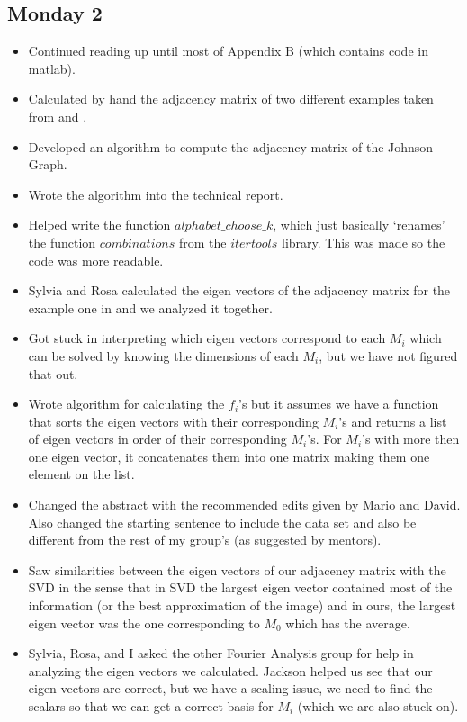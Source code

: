\documentclass{article}
\begin{document}
\subsection{Monday 2}
    \begin{itemize}
        \item Continued reading \cite{Senior-Thesis} up until most of Appendix B (which contains code in matlab).
        \item Calculated by hand the adjacency matrix of two different examples taken from \cite{Senior-Thesis} and \cite{Court}.
        \item Developed an algorithm to compute the adjacency matrix of the Johnson Graph.
        \item Wrote the algorithm into the technical report.
        \item Helped write the function $alphabet\_choose\_k$, which just basically `renames' the function $combinations$ from the $itertools$ library. This was made so the code was more readable. 
        \item Sylvia and Rosa calculated the eigen vectors of the adjacency matrix for the example one in \cite{Court} and we analyzed it together.
        \item Got stuck in interpreting which eigen vectors correspond to each $M_i$ which can be solved by knowing the dimensions of each $M_i$, but we have not figured that out.
        \item Wrote algorithm for calculating the $f_i$'s but it assumes we have a function that sorts the eigen vectors with their corresponding $M_i$'s and returns a list of eigen vectors in order of their corresponding $M_i$'s. For $M_i$'s with more then one eigen vector, it concatenates them into one matrix making them one element on the list.
        \item Changed the abstract with the recommended edits given by Mario and David. Also changed the starting sentence to include the data set and also be different from the rest of my group's (as suggested by mentors).
        \item Saw similarities between the eigen vectors of our adjacency matrix with the SVD in the sense that in SVD the largest eigen vector contained most of the information (or the best approximation of the image) and in ours, the largest eigen vector was the one corresponding to $M_0$ which has the average.
        \item Sylvia, Rosa, and I asked the other Fourier Analysis group for help in analyzing the eigen vectors we calculated. Jackson helped us see that our eigen vectors are correct, but we have a scaling issue, we need to find the scalars so that we can get a correct basis for $M_i$ (which we are also stuck on).
    \end{itemize}
\end{document}
